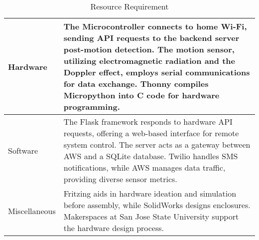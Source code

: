 \begin{table}[htbp]
    \begin{center}
        \begin{tabular}{|p{0.2\linewidth}|p{0.8\linewidth}|}
            \hline
            Hardware & The Microcontroller connects to home Wi-Fi, sending API requests to the backend server post-motion detection. The motion sensor, utilizing electromagnetic radiation and the Doppler effect, employs serial communications for data exchange. Thonny compiles Micropython into C code for hardware programming.
            \\
            \hline
            Software & The Flask framework responds to hardware API requests, offering a web-based interface for remote system control. The server acts as a gateway between AWS and a SQLite database. Twilio handles SMS notifications, while AWS manages data traffic, providing diverse sensor metrics.
            \\
            \hline
            Miscellaneous & Fritzing aids in hardware ideation and simulation before assembly, while SolidWorks designs enclosures. Makerspaces at San Jose State University support the hardware design process. \\
            \hline
        \end{tabular}
        \label{tab1}
    \end{center}
    \caption{Resource Requirement}
\end{table}